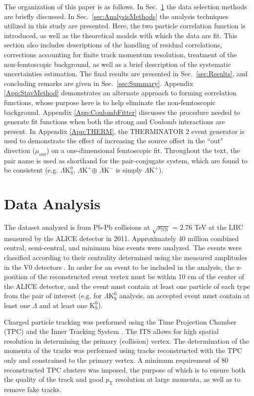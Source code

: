 \documentclass[ALICE,manyauthors]{cernphprep}
\newcommand{\pt}{$p_{\mathrm{T}}$\xspace}
\newcommand{\Lam}{$\Lambda$\xspace}
\newcommand{\Ks}{$\mathrm{K^{0}_{S}}$\xspace}
\newcommand{\LamKchP}{$\Lambda\mathrm{K^{+}}$\xspace}
\newcommand{\ALamKchM}{$\bar{\Lambda}\mathrm{K^{-}}$\xspace}
\newcommand{\LamKs}{$\Lambda\mathrm{K^{0}_{S}}$\xspace}
\begin{document}
The organization of this paper is as follows.  
In Sec.\ \ref{sec:DataAnalysis} the data selection methods are briefly discussed.
In Sec.\ \ref{sec:AnalysisMethods} the analysis techniques utilized in this study are presented.  
Here, the two particle correlation function is introduced, as well as the theoretical models with which the data are fit.  
This section also includes descriptions of the handling of residual correlations, corrections accounting for finite track momentum resolution, treatment of the non-femtoscopic background, as well as a brief description of the systematic uncertainties estimation.  
The final results are presented in Sec.\ \ref{sec:Results}, and concluding remarks are given in Sec.\ \ref{sec:Summary}.
Appendix \ref{App:StavMethod} demonstrates an alternate approach to forming correlation functions, whose purpose here is to help eliminate the non-femtoscopic background.
Appendix \ref{App:CoulombFitter} discusses the procedure needed to generate fit functions when both the strong and Coulomb interactions are present.
In Appendix \ref{App:THERM}, the THERMINATOR 2 event generator is used to demonstrate the effect of increasing the source offset in the ``out" direction ($\mu_{\mathrm{out}}$) on a one-dimensional femtoscopic fit.
Throughout the text, the pair name is used as shorthand for the pair-conjugate system, which are found to be consistent (e.g. \LamKs, \LamKchP $\oplus$ \ALamKchM is simply \LamKchP).

\section{Data Analysis}
\label{sec:DataAnalysis}

The dataset analyzed is from Pb-Pb collisions at $\sqrt{s_{\mathrm{NN}}}$ = 2.76 TeV at the LHC measured by the ALICE detector \cite{1748-0221-3-08-S08002} in 2011.
Approximately 40 million combined central, semi-central, and minimum bias events were analyzed.
The events were classified according to their centrality determined using the measured amplitudes in the V0 detectors \cite{Abelev:2013qoq}.  
In order for an event to be included in the analysis, the z-position of the reconstructed event vertex must be within 10 cm of the center of the ALICE detector, and the event must contain at least one particle of each type from the pair of interest (e.g. for \LamKs analysis, an accepted event must contain at least one \Lam and at least one \Ks). 

Charged particle tracking was performed using the Time Projection Chamber (TPC) \cite{2010NIMPA.622..316A} and the Inner Tracking System \cite{0954-3899-41-8-087002}.  
The ITS allows for high spatial resolution in determining the primary (collision) vertex.
The determination of the momenta of the tracks was performed using tracks reconstructed with the TPC only and constrained to the primary vertex.
A minimum requirement of 80 reconstructed TPC clusters was imposed, the purpose of which is to ensure both the quality of the track and good \pt resolution at large momenta, as well as to remove fake tracks.
\end{document}
